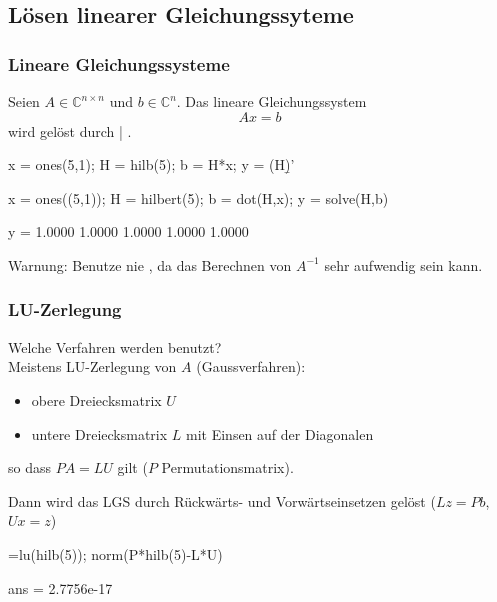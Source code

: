 \documentclass[hyperref={xetex}]{beamer}
\begin{document}
\subsection{Lösen linearer Gleichungssyteme}
% 
%
\begin{frame}[fragile]\frametitle{Lineare Gleichungssysteme}
Seien $A \in \mathbb{C}^{n\times n}$ und $b \in \mathbb{C}^n$. Das
lineare Gleichungssystem 
{ \[ A x=b \]}
wird gelöst durch  | .\\

\begin{matlabin}
x = ones(5,1); H = hilb(5); b = H*x; y = (H\b)'
\end{matlabin}
\begin{pyin}
x = ones((5,1)); H = hilbert(5); b = dot(H,x); y = solve(H,b)  
\end{pyin}
\begin{matlab}
y = 1.0000    1.0000    1.0000    1.0000    1.0000
\end{matlab}

\alert{Warnung:} Benutze nie
, da das Berechnen von $A^{-1}$ sehr aufwendig sein kann.
\end{frame}
% 
%
\begin{frame}[fragile]\frametitle{LU-Zerlegung}
{\centering  Welche Verfahren werden benutzt?}\\[0.5cm]

Meistens LU-Zerlegung von $A$ (Gaussverfahren):
\begin{itemize}
 \item obere Dreiecksmatrix $U$
 \item untere Dreiecksmatrix $L$ mit Einsen auf der Diagonalen
\end{itemize}
so dass $PA=LU$ gilt ($P$ Permutationsmatrix).

Dann wird das LGS durch Rückwärts- und Vorwärtseinsetzen gelöst
($Lz = Pb$, $Ux = z$)

\begin{matlabin}
[L,U,P]=lu(hilb(5)); norm(P*hilb(5)-L*U)
\end{matlabin}
\begin{matlab}
ans =  2.7756e-17
\end{matlab}
\end{frame}
% 
%
\end{document}
